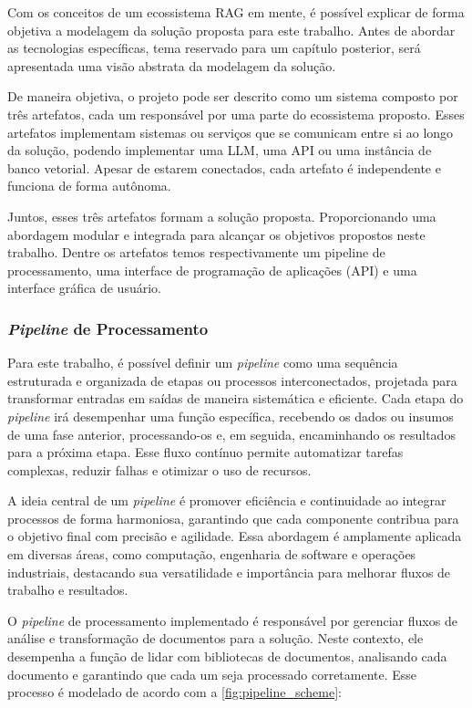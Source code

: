 \documentclass[a4paper, 12pt]{article}
\begin{document}
    Com os conceitos de um ecossistema RAG em mente, é possível explicar de forma objetiva a modelagem da solução proposta para este trabalho. Antes de abordar as tecnologias específicas, tema reservado para um capítulo posterior, será apresentada uma visão abstrata da modelagem da solução.

    De maneira objetiva, o projeto pode ser descrito como um sistema composto por três artefatos, cada um responsável por uma parte do ecossistema proposto. Esses artefatos implementam sistemas ou serviços que se comunicam entre si ao longo da solução, podendo implementar uma LLM, uma API ou uma instância de banco vetorial. Apesar de estarem conectados, cada artefato é independente e funciona de forma autônoma.
    
    Juntos, esses três artefatos formam a solução proposta. Proporcionando uma abordagem modular e integrada para alcançar os objetivos propostos neste trabalho. Dentre os artefatos temos respectivamente um pipeline de processamento, uma interface de programação de aplicações (API) e uma interface gráfica de usuário.
    
    \subsubsection{\textit{Pipeline} de Processamento} \label{sec:pipeline}

    Para este trabalho, é possível definir um \textit{pipeline} como uma sequência estruturada e organizada de etapas ou processos interconectados, projetada para transformar entradas em saídas de maneira sistemática e eficiente. Cada etapa do \textit{pipeline} irá desempenhar uma função específica, recebendo os dados ou insumos de uma fase anterior, processando-os e, em seguida, encaminhando os resultados para a próxima etapa. Esse fluxo contínuo permite automatizar tarefas complexas, reduzir falhas e otimizar o uso de recursos. 
    
    A ideia central de um \textit{pipeline} é promover eficiência e continuidade ao integrar processos de forma harmoniosa, garantindo que cada componente contribua para o objetivo final com precisão e agilidade. Essa abordagem é amplamente aplicada em diversas áreas, como computação, engenharia de software e operações industriais, destacando sua versatilidade e importância para melhorar fluxos de trabalho e resultados. 

    O \textit{pipeline} de processamento implementado é responsável por gerenciar fluxos de análise e transformação de documentos para a solução. Neste contexto, ele desempenha a função de lidar com bibliotecas de documentos, analisando cada documento e garantindo que cada um seja processado corretamente. Esse processo é modelado de acordo com a \autoref{fig:pipeline_scheme}:
    
\end{document}
